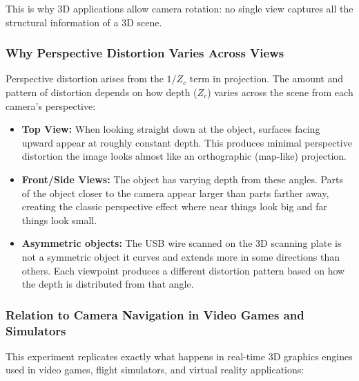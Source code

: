 \documentclass[12pt]{article}
\begin{document}
This is why 3D applications allow camera rotation: no single view captures all the structural information of a 3D scene.

\subsubsection*{Why Perspective Distortion Varies Across Views}

Perspective distortion arises from the $1/Z_c$ term in projection. The amount and pattern of distortion depends on how depth ($Z_c$) varies across the scene from each camera's perspective:

\begin{itemize}
    \item \textbf{Top View:} When looking straight down at the object, surfaces facing upward appear at roughly constant depth. This produces minimal perspective distortion the image looks almost like an orthographic (map-like) projection.
    \item \textbf{Front/Side Views:} The object has varying depth from these angles. Parts of the object closer to the camera appear larger than parts farther away, creating the classic perspective effect where near things look big and far things look small.
    \item \textbf{Asymmetric objects:} The USB wire scanned on the 3D scanning plate is not a symmetric object it curves and extends more in some directions than others. Each viewpoint produces a different distortion pattern based on how the depth is distributed from that angle.
\end{itemize}

\subsubsection*{Relation to Camera Navigation in Video Games and Simulators}

This experiment replicates exactly what happens in real-time 3D graphics engines used in video games, flight simulators, and virtual reality applications:
\end{document}
